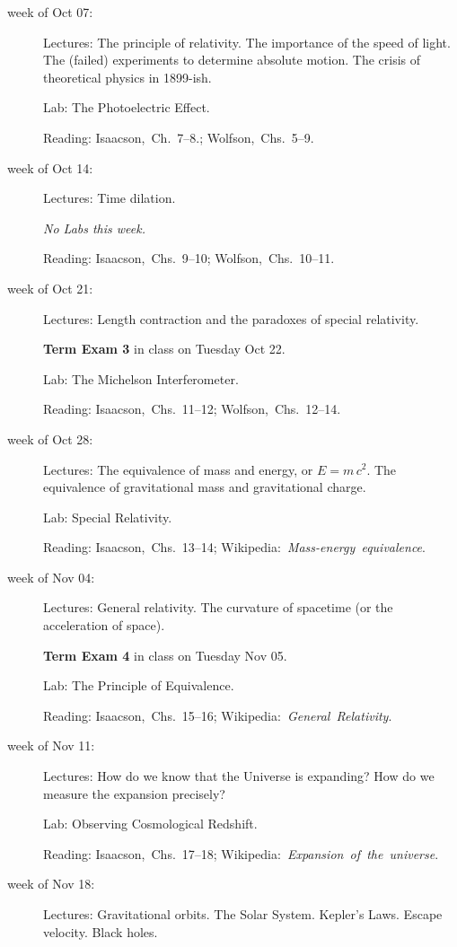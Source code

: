 \documentclass[12pt]{article}
\begin{document}
\begin{description}
\item[week of Oct 07:] Lectures: The principle of relativity. The
  importance of the speed of light. The (failed) experiments to
  determine absolute motion. The crisis of theoretical physics in
  1899-ish.

  Lab: The Photoelectric Effect.

  Reading:
  Isaacson,~Ch.~7--8.;
  Wolfson,~Chs.~5--9.

\item[week of Oct 14:] Lectures: Time dilation.

  \textsl{No Labs this week.}

  Reading:
  Isaacson,~Chs.~9--10;
  Wolfson,~Chs.~10--11.

\item[week of Oct 21:] Lectures: Length contraction and the paradoxes
  of special relativity.

  \textbf{Term Exam 3} in class on Tuesday Oct 22.

  Lab: The Michelson Interferometer.

  Reading: Isaacson,~Chs.~11--12;
           Wolfson,~Chs.~12--14.

\item[week of Oct 28:] Lectures: The equivalence of mass and energy,
  or $E = m\,c^2$. The equivalence of gravitational mass and
  gravitational charge.

  Lab: Special Relativity.

  Reading: Isaacson,~Chs.~13--14;
  Wikipedia:~\textit{Mass-energy~equivalence}.

\item[week of Nov 04:] Lectures: General relativity. The curvature of
  spacetime (or the acceleration of space).

  \textbf{Term Exam 4} in class on Tuesday Nov 05.

  Lab: The Principle of Equivalence.

  Reading: Isaacson,~Chs.~15--16;
  Wikipedia:~\textit{General~Relativity}.

\item[week of Nov 11:] Lectures: How do we know that the Universe
  is expanding? How do we measure the expansion precisely?

  Lab: Observing Cosmological Redshift.

  Reading: Isaacson,~Chs.~17--18;
  Wikipedia:~\textit{Expansion~of~the~universe}.

\item[week of Nov 18:] Lectures: Gravitational orbits. The Solar
  System. Kepler's Laws. Escape velocity. Black holes.


\end{description}
\end{document}
